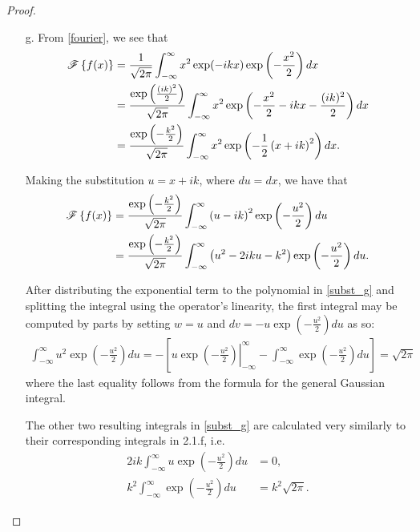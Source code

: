 \begin{proof}
\begin{enumerate}
    \item [g.] From \eqref{fourier}, we see that
      \begin{align*}
        \mathscr{F}\left\{ {f(x)} \right\} &= \frac{1}{\sqrt{2 \pi}} \int_{-\infty}^{\infty} x^2 \exp(-ikx) \exp \left( -\frac{x^2}{2} \right) dx \\
        &= \frac{\exp\left( \frac{(ik)^2}{2} \right)}{\sqrt{2 \pi}} \int_{-\infty}^{\infty} x^2 \exp\left(-\frac{x^2}{2} - ikx - \frac{(ik)^2}{2}\right)  dx \\
        &= \frac{\exp\left( -\frac{k^2}{2} \right)}{\sqrt{2 \pi}} \int_{-\infty}^{\infty} x^2 \exp\left(-\frac{1}{2} \left(x + ik\right)^2 \right)  dx.
      \end{align*}

      Making the substitution $u = x + ik$, where $du = dx$, we have that
      \begin{align}\label{subst_g}
        \mathscr{F}\left\{ {f(x)} \right\} &= \frac{\exp\left( -\frac{k^2}{2} \right)}{\sqrt{2 \pi}} \int_{-\infty}^{\infty} \left(u - ik\right)^2 \exp\left(-\frac{u^2}{2}  \right)  du \notag \\
        &= \frac{\exp\left( -\frac{k^2}{2} \right)}{\sqrt{2 \pi}} \int_{-\infty}^{\infty} \left(u^2 -2 i k u - k^2\right) \exp\left(-\frac{u^2}{2}  \right)  du.
      \end{align}

      After distributing the exponential term to the polynomial in \eqref{subst_g} and splitting the integral using the operator's linearity,
      the first integral may be computed by parts by setting $w = u$ and $dv = -u \exp\left(-\frac{u^2}{2}\right) du$ as so:
      \begin{align*}
        \int_{-\infty}^{\infty} u^2 \exp\left(-\frac{u^2}{2}  \right) du = -\left[ \left. u \exp\left(-\frac{u^2}{2}\right) \right\rvert_{-\infty}^{\infty} - \int_{-\infty}^{\infty} \exp\left(-\frac{u^2}{2}\right) du \right] = \sqrt{2\pi}
      \end{align*}
      where the last equality follows from the formula for the general Gaussian integral.

      The other two resulting integrals in \eqref{subst_g} are calculated very similarly to their corresponding integrals in 2.1.f, i.e.\
      \begin{align*}
        2 i k \int_{-\infty}^{\infty} u \exp\left(-\frac{u^2}{2}  \right) du &= 0, \\
        k^2 \int_{-\infty}^{\infty} \exp\left(-\frac{u^2}{2}  \right) du &= k^2\sqrt{2\pi}.
      \end{align*}


\end{enumerate}
\end{proof}
